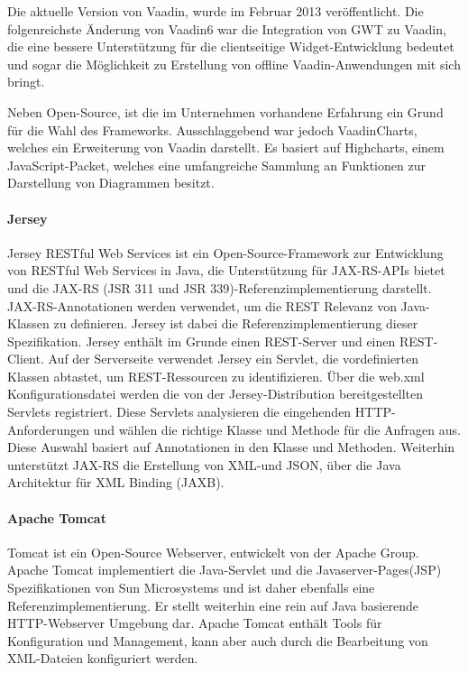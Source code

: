 Die aktuelle Version von Vaadin, wurde im Februar 2013 veröffentlicht. Die folgenreichste Änderung von Vaadin6 war die Integration von GWT zu Vaadin, die eine bessere Unterstützung für die clientseitige Widget-Entwicklung bedeutet und sogar die Möglichkeit zu Erstellung von offline Vaadin-Anwendungen mit sich bringt.

Neben Open-Source, ist die im Unternehmen vorhandene Erfahrung ein Grund für die Wahl des Frameworks. Ausschlaggebend war jedoch VaadinCharts, welches ein Erweiterung von Vaadin darstellt. Es basiert auf Highcharts, einem JavaScript-Packet, welches eine umfangreiche Sammlung an Funktionen zur Darstellung von Diagrammen besitzt. 

\paragraph{Jersey}

Jersey RESTful Web Services ist ein Open-Source-Framework zur Entwicklung von RESTful Web Services in Java, die Unterstützung für JAX-RS-APIs bietet und die JAX-RS (JSR 311 und JSR 339)-Referenzimplementierung darstellt. JAX-RS-Annotationen werden verwendet, um die REST Relevanz von Java-Klassen zu definieren. Jersey ist dabei die Referenzimplementierung dieser Spezifikation. Jersey enthält im Grunde einen REST-Server und einen REST-Client. Auf der Serverseite verwendet Jersey ein Servlet, die vordefinierten Klassen abtastet, um REST-Ressourcen zu identifizieren. Über die web.xml Konfigurationsdatei werden die von der Jersey-Distribution bereitgestellten Servlets registriert. Diese Servlets analysieren die eingehenden HTTP-Anforderungen und wählen die richtige Klasse und Methode für die Anfragen aus. Diese Auswahl basiert auf Annotationen in den Klasse und Methoden. Weiterhin unterstützt JAX-RS die Erstellung von XML-und JSON, über die Java Architektur für XML Binding (JAXB).

\paragraph{Apache Tomcat}

Tomcat ist ein Open-Source Webserver, entwickelt von der Apache Group. Apache Tomcat implementiert die Java-Servlet und die Javaserver-Pages(JSP) Spezifikationen von Sun Microsystems und ist daher ebenfalls eine Referenzimplementierung. Er stellt weiterhin eine rein auf Java basierende HTTP-Webserver Umgebung dar. Apache Tomcat enthält Tools für Konfiguration und Management, kann aber auch durch die Bearbeitung von XML-Dateien konfiguriert werden.

